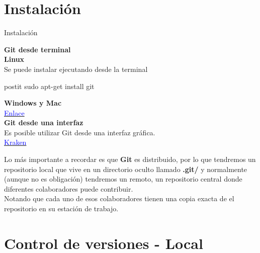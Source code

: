 \documentclass{beamer}
\begin{document}
\section{Instalación}
\begin{frame}{Instalación}

\textbf{Git desde terminal} \\

\textbf{Linux} \\

Se puede instalar ejecutando desde la terminal \\

\begin{beamercolorbox}[wd={5cm},sep=1mm]{postit}
sudo apt-get install git
\end{beamercolorbox}

\textbf{Windows y Mac} \\

\href{https://git-scm.com/downloads}{\textcolor{blue}{Enlace}} \\

\textbf{Git desde una interfaz}\\
Es posible utilizar Git desde una interfaz gráfica. \\

\href{https://www.gitkraken.com/}{\textcolor{blue}{Kraken}}

\begin{block}
\tiny{
Lo más importante a recordar es que \textbf{Git} es distribuido, por lo que tendremos un repositorio local que vive en un directorio oculto llamado \textbf{.git/} y normalmente (aunque no es obligación) tendremos un remoto, un repositorio central donde diferentes colaboradores puede contribuir.} \\

Notando que cada uno de esos colaboradores tienen una copia exacta de el repositorio en su estación de trabajo.
\end{block}
\end{frame}

\section{Control de versiones - \textbf{Local}}
\end{document}
